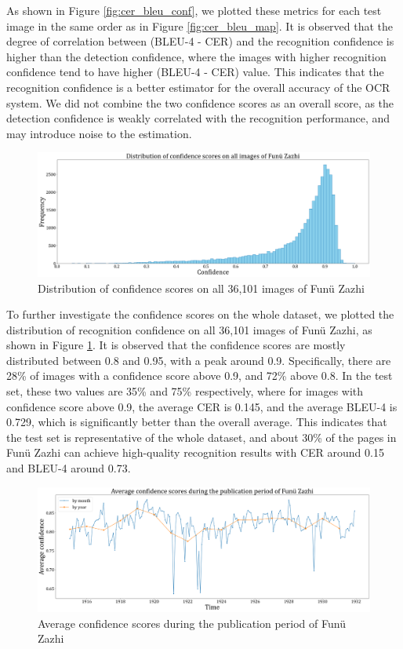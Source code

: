 \documentclass[12pt,twoside]{report}
\begin{document}
As shown in Figure \ref{fig:cer_bleu_conf}, we plotted these metrics for each test image in the same order as in Figure \ref{fig:cer_bleu_map}. It is observed that the degree of correlation between (BLEU-4 - CER) and the recognition confidence is higher than the detection confidence, where the images with higher recognition confidence tend to have higher (BLEU-4 - CER) value. This indicates that the recognition confidence is a better estimator for the overall accuracy of the OCR system. We did not combine the two confidence scores as an overall score, as the detection confidence is weakly correlated with the recognition performance, and may introduce noise to the estimation.

\begin{figure}[htbp]
    \centering
    \includegraphics[width=\textwidth]{./figures/confidence1.png}
    \caption{Distribution of confidence scores on all 36,101 images of Funü Zazhi}
    \label{fig:confidence1}
\end{figure}

To further investigate the confidence scores on the whole dataset, we plotted the distribution of recognition confidence on all 36,101 images of Funü Zazhi, as shown in Figure \ref{fig:confidence1}. It is observed that the confidence scores are mostly distributed between 0.8 and 0.95, with a peak around 0.9. Specifically, there are 28\% of images with a confidence score above 0.9, and 72\% above 0.8. In the test set, these two values are 35\% and 75\% respectively, where for images with confidence score above 0.9, the average CER is 0.145, and the average BLEU-4 is 0.729, which is significantly better than the overall average. This indicates that the test set is representative of the whole dataset, and about 30\% of the pages in Funü Zazhi can achieve high-quality recognition results with CER around 0.15 and BLEU-4 around 0.73.

\begin{figure}[htbp]
    \centering
    \includegraphics[width=\textwidth]{./figures/confidence2.png}
    \caption{Average confidence scores during the publication period of Funü Zazhi}
    \label{fig:confidence2}
\end{figure}
\end{document}
